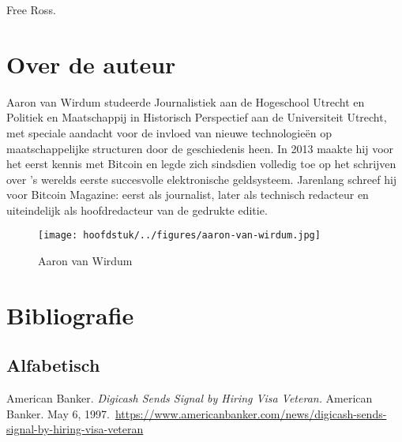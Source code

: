 \documentclass[
  a5paper,
  smalldemyvopaper,11pt,twoside,onecolumn,openright,extrafontsizes,
hidelinks]{memoir}
\begin{document}
Free Ross.


\chapter*{Over de auteur}\label{over-de-auteur}


Aaron van Wirdum studeerde Journalistiek aan de Hogeschool Utrecht en
Politiek en Maatschappij in Historisch Perspectief aan de Universiteit
Utrecht, met speciale aandacht voor de invloed van nieuwe technologieën
op maatschappelijke structuren door de geschiedenis heen. In 2013 maakte
hij voor het eerst kennis met Bitcoin en legde zich sindsdien volledig
toe op het schrijven over 's werelds eerste succesvolle elektronische
geldsysteem. Jarenlang schreef hij voor Bitcoin Magazine: eerst als
journalist, later als technisch redacteur en uiteindelijk als
hoofdredacteur van de gedrukte editie.

\begin{figure}[H]

{\centering \texttt{[image: hoofdstuk/../figures/aaron-van-wirdum.jpg]}

}

\caption{Aaron van Wirdum}

\end{figure}%


\chapter*{Bibliografie}\label{bibliografie}

\setlength{\parindent}{0pt} %
\setlength{\parskip}{0.8em}   %


\section*{Alfabetisch}\label{alfabetisch}


American Banker. \emph{Digicash Sends Signal by Hiring Visa Veteran.}
American Banker. May 6,
1997.~\url{https://www.americanbanker.com/news/digicash-sends-signal-by-hiring-visa-veteran}
\end{document}

